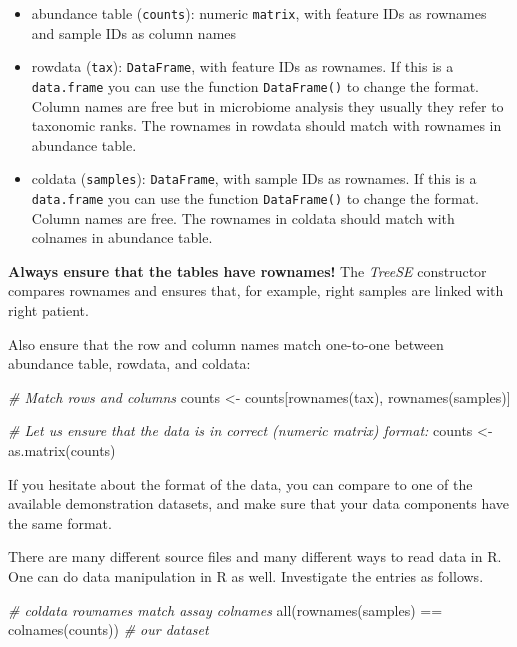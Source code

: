\documentclass[
]{book}
\newenvironment{Shaded}{\begin{snugshade}}{\end{snugshade}}
\newcommand{\CommentTok}[1]{\textcolor[rgb]{0.56,0.35,0.01}{\textit{#1}}}
\newcommand{\FunctionTok}[1]{\textcolor[rgb]{0.00,0.00,0.00}{#1}}
\newcommand{\NormalTok}[1]{#1}
\newcommand{\OtherTok}[1]{\textcolor[rgb]{0.56,0.35,0.01}{#1}}
\newcommand{\SpecialCharTok}[1]{\textcolor[rgb]{0.00,0.00,0.00}{#1}}
\begin{document}
\begin{itemize}
\item
  abundance table (\texttt{counts}): numeric \texttt{matrix}, with feature IDs as
  rownames and sample IDs as column names
\item
  rowdata (\texttt{tax}): \texttt{DataFrame}, with feature IDs as rownames. If this
  is a \texttt{data.frame} you can use the function \texttt{DataFrame()} to change
  the format. Column names are free but in microbiome analysis they
  usually they refer to taxonomic ranks. The rownames in rowdata
  should match with rownames in abundance table.
\item
  coldata (\texttt{samples}): \texttt{DataFrame}, with sample IDs as rownames. If
  this is a \texttt{data.frame} you can use the function \texttt{DataFrame()} to
  change the format. Column names are free. The rownames in coldata
  should match with colnames in abundance table.
\end{itemize}

\textbf{Always ensure that the tables have rownames!} The \emph{TreeSE} constructor compares
rownames and ensures that, for example, right samples are linked with right patient.

Also ensure that the row and column names match one-to-one between
abundance table, rowdata, and coldata:

\begin{Shaded}
\begin{Highlighting}[]
\CommentTok{\# Match rows and columns}
\NormalTok{counts }\OtherTok{\textless{}{-}}\NormalTok{ counts[}\FunctionTok{rownames}\NormalTok{(tax), }\FunctionTok{rownames}\NormalTok{(samples)]}

\CommentTok{\# Let us ensure that the data is in correct (numeric matrix) format:}
\NormalTok{counts }\OtherTok{\textless{}{-}} \FunctionTok{as.matrix}\NormalTok{(counts)}
\end{Highlighting}
\end{Shaded}

If you hesitate about the format of the data, you can compare to one
of the available demonstration datasets, and make sure that your data
components have the same format.

There are many different source files and many different ways to read
data in R. One can do data manipulation in R as well. Investigate the
entries as follows.

\begin{Shaded}
\begin{Highlighting}[]
\CommentTok{\# coldata rownames match assay colnames}
\FunctionTok{all}\NormalTok{(}\FunctionTok{rownames}\NormalTok{(samples) }\SpecialCharTok{==} \FunctionTok{colnames}\NormalTok{(counts)) }\CommentTok{\# our dataset}
\end{Highlighting}
\end{Shaded}
\end{document}
